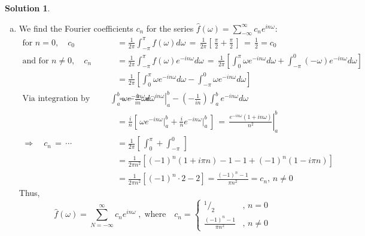 \documentclass[10pt]{article}
\theoremstyle{plain}
\theoremstyle{definition}
\newtheorem*{soln*}{Solution}
\numberwithin{equation}{section}
\newcommand*\rfrac[2]{{}^{#1}\!/_{#2}}
\begin{document}
\begin{soln*} %
    \begin{enumerate}[(a)]
        \item 
            We find the Fourier coefficients $c_n$ for the series
            $\hat{f}(\omega) = \sum_{-\infty}^\infty c_n e^{in\omega} $:
            \begin{align*}
                \text{for } n = 0, \quad
                c_0 &= \frac{1}{2\pi} \int_{-\pi}^{\pi} f(\omega) d\omega
                \,=\, \frac{1}{2\pi}\left[\,\frac{\pi}{2} + \frac{\pi}{2}\,\right]
                \,=\, \boxed{\frac{1}{2} = c_0} \\
                \text{and for } n \neq 0, \quad
                c_n &= \frac{1}{2\pi} \int_{-\pi}^{\pi} f(\omega) e^{- i n\omega} d\omega 
                    \,=\, \frac{1}{2\pi}
                        \left[ \int_{0}^{\pi} \omega e^{-in\omega} d\omega
                        + \int_{-\pi}^{0} \left(-\omega\right) e^{-in\omega} d\omega \right] \\
                        &= \frac{1}{2\pi}
                        \left[ \int_{0}^{\pi} \omega e^{-in\omega} d\omega
                        - \int_{-\pi}^{0} \omega e^{-in\omega} d\omega \right] \\
                \text{Via integration by parts, }   \int_a^b \omega e^{-in\omega} d\omega
                        &= \left.-\frac{1}{in} \omega e^{-in\omega}\right|_a^b 
                        - \left(-\frac{1}{in}\right)\int_a^b e^{-in\omega} d\omega \\
                        &= \frac{i}{n}\left[\, \omega e^{-in\omega}\Big|_a^b
                            + \frac{i}{n}e^{-in\omega}\Big|_a^b \, \right]
                            \,=\, \left.\frac{e^{-in\omega}(1+in\omega)}{n^2}\right|_a^b \\
                            \Longrightarrow \quad c_n \,=\, \cdots
                            &= \frac{1}{2\pi}\left[\, \int_0^\pi + \int_{-\pi}^{0} \,\right] \\
                            &= \frac{1}{2\pi n^2}
                                \left[ (-1)^n (1 + i\pi n) - 1 - 1 + (-1)^n (1 - i\pi n)\right] \\
                                &= \frac{1}{2\pi n^2} \left[ (-1)^n \cdot 2 - 2 \right]
                                = \boxed{\frac{{(-1)}^n - 1}{\pi n^2 } = c_n ,\, n\neq 0}
            \end{align*}
        Thus,
        \[
                \hat{f}(\omega) = \sum_{N=-\infty}^{\infty} c_n e^{in\omega}
                \; ,\;\text{where}\quad  c_n =
                \left\{\begin{array}{cr}
                        \rfrac{1}{2}                    & ,\, n = 0 \\[4pt]
                        \frac{{(-1)}^n - 1}{\pi n^2}    & ,\, n\neq 0
                    \end{array}\right.
            \]
                

\end{enumerate}
\end{soln*}
\end{document}

